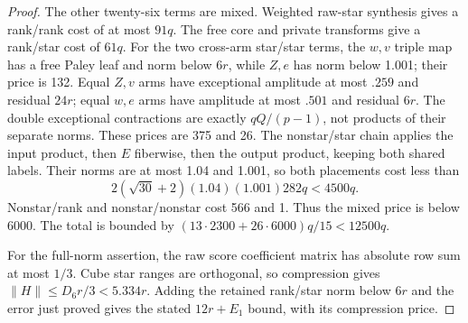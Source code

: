 \begin{proof}
The other twenty-six terms are mixed.  Weighted raw-star synthesis
gives a rank/rank cost of at most $91q$.
The free core and private transforms give a rank/star cost of $61q$.
For the two cross-arm star/star
terms, the $w,v$ triple map has a free Paley leaf and norm below $6r$,
while $Z,e$ has norm below 1.001; their price is 132.  Equal $Z,v$
arms have exceptional amplitude at most $.259$ and residual $24r$;
equal $w,e$ arms have amplitude at most $.501$ and residual $6r$.
The double exceptional contractions are exactly $qQ/(p-1)$, not
products of their separate norms.  These prices are 375 and 26.
The nonstar/star chain applies the input product, then $E$ fiberwise,
then the output product, keeping both shared labels.  Their norms
are at most 1.04 and 1.001, so both placements cost less than
\[
 2(\sqrt{30}+2)(1.04)(1.001)282q<4500q.
\]
Nonstar/rank and nonstar/nonstar cost 566 and 1.  Thus the mixed
price is below 6000.  The total is bounded by
$(13\cdot2300+26\cdot6000)q/15<12500q$.

For the full-norm assertion, the raw score coefficient matrix has
absolute row sum at most $1/3$.  Cube star ranges are orthogonal,
so compression gives $\|H\|\le D_6r/3<5.334r$.
Adding the retained rank/star norm below $6r$ and the error just
proved gives the stated $12r+E_1$ bound, with its compression price.
\end{proof}

